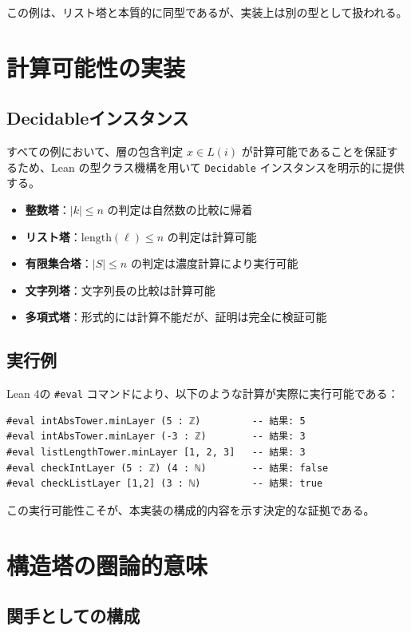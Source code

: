 \documentclass[a4paper,12pt]{ltjsarticle}
\theoremstyle{definition}
\begin{document}
この例は、リスト塔と本質的に同型であるが、実装上は別の型として扱われる。

\section{計算可能性の実装}

\subsection{Decidableインスタンス}

すべての例において、層の包含判定 $x \in L(i)$ が計算可能であることを保証するため、Lean の型クラス機構を用いて \texttt{Decidable} インスタンスを明示的に提供する。

\begin{itemize}
\item \textbf{整数塔}：$|k| \leq n$ の判定は自然数の比較に帰着
\item \textbf{リスト塔}：$\mathrm{length}(\ell) \leq n$ の判定は計算可能
\item \textbf{有限集合塔}：$|S| \leq n$ の判定は濃度計算により実行可能
\item \textbf{文字列塔}：文字列長の比較は計算可能
\item \textbf{多項式塔}：形式的には計算不能だが、証明は完全に検証可能
\end{itemize}

\subsection{実行例}

Lean 4の \texttt{\#eval} コマンドにより、以下のような計算が実際に実行可能である：

\begin{verbatim}
#eval intAbsTower.minLayer (5 : ℤ)         -- 結果: 5
#eval intAbsTower.minLayer (-3 : ℤ)        -- 結果: 3
#eval listLengthTower.minLayer [1, 2, 3]   -- 結果: 3
#eval checkIntLayer (5 : ℤ) (4 : ℕ)        -- 結果: false
#eval checkListLayer [1,2] (3 : ℕ)         -- 結果: true
\end{verbatim}

この実行可能性こそが、本実装の構成的内容を示す決定的な証拠である。

\section{構造塔の圏論的意味}

\subsection{関手としての構成}
\end{document}
